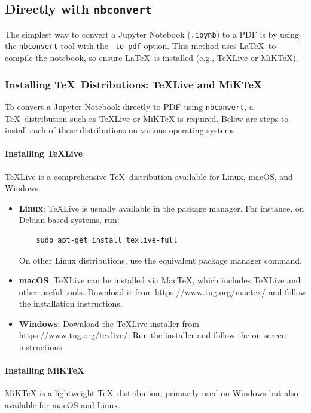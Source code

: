 \documentclass{article}
\begin{document}
\subsection{Directly with \texttt{nbconvert}}

The simplest way to convert a Jupyter Notebook (\texttt{.ipynb}) to a PDF is by using the \texttt{nbconvert} tool with the \texttt{-to pdf} option. This method uses \LaTeX~to compile the notebook, so ensure \LaTeX~is installed (e.g., TeXLive or MiKTeX).
\subsubsection{Installing \TeX~Distributions: TeXLive and MiKTeX}

To convert a Jupyter Notebook directly to PDF using \texttt{nbconvert}, a \TeX~distribution such as TeXLive or MiKTeX is required. Below are steps to install each of these distributions on various operating systems.

\paragraph{Installing TeXLive}
TeXLive is a comprehensive \TeX~distribution available for Linux, macOS, and Windows.

\begin{itemize}
    \item \textbf{Linux}: TeXLive is usually available in the package manager. For instance, on Debian-based systems, run:
    \begin{verbatim}
    sudo apt-get install texlive-full
    \end{verbatim}
    On other Linux distributions, use the equivalent package manager command.
    
    \item \textbf{macOS}: TeXLive can be installed via MacTeX, which includes TeXLive and other useful tools. Download it from \url{https://www.tug.org/mactex/} and follow the installation instructions.
    
    \item \textbf{Windows}: Download the TeXLive installer from \url{https://www.tug.org/texlive/}. Run the installer and follow the on-screen instructions.
\end{itemize}

\paragraph{Installing MiKTeX}
MiKTeX is a lightweight \TeX~distribution, primarily used on Windows but also available for macOS and Linux.
\end{document}
